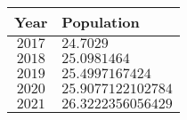 \begin{tabular}{cl}           \toprule
Year   & Population         \\\midrule
$2017$ & $24.7029$          \\[4pt]
$2018$ & $25.0981464$       \\[4pt]
$2019$ & $25.4997167424$    \\[4pt]
$2020$ & $25.9077122102784$ \\[4pt]
$2021$ & $26.3222356056429$ \\\bottomrule
\end{tabular}
